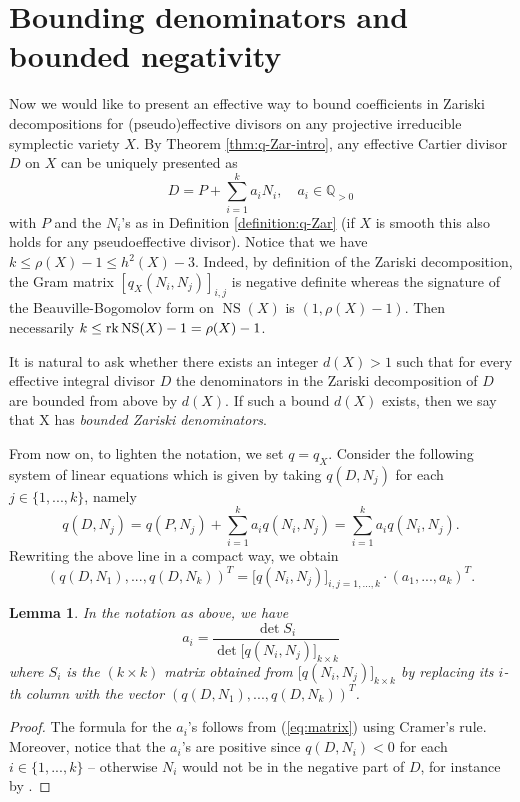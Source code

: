 \documentclass[12pt,reqno]{amsart}
\theoremstyle{plain}
\newtheorem{lemma}[thm]{Lemma}
\theoremstyle{definition}
\begin{document}
\section{Bounding denominators and bounded negativity}
Now we would like to present an effective way to bound coefficients in Zariski decompositions for (pseudo)effective divisors on any projective irreducible symplectic variety $X$.
By Theorem \ref{thm:q-Zar-intro}, any effective Cartier divisor $D$ on $X$  can be uniquely presented as
$$D = P + \sum_{i=1}^{k} a_{i}N_{i}, \quad  a_{i} \in \mathbb{Q}_{>0}$$
with $P$ and the $N_i$'s as in Definition \ref{definition:q-Zar} (if $X$ is smooth this also holds for any pseudoeffective divisor).
Notice that  we have  $k \leq \rho(X)-1 \leq h^2(X)-3$. Indeed, by definition of the Zariski decomposition,  the Gram matrix $[q_X(N_i,N_j)]_{i,j}$ is negative definite whereas the signature of the Beauville-Bogomolov form on $\operatorname{NS}(X)$ is $(1,\rho(X)-1)$. Then necessarily $k\leq \mathrm{rk} \, {\rm NS}(X)-1=\rho(X)-1$. 

It is natural to ask whether there exists an integer
$d(X) > 1$ such that for every effective integral divisor $D$ the denominators in the
Zariski decomposition of $D$ are bounded from above by $d(X)$.
If such a bound $d(X)$ exists, then we say that X has {\it bounded Zariski denominators}.

From now on, to lighten the notation, we set $q=q_X$. 
Consider the following system of linear equations which is given by taking $q(D,N_{j})$ for each $j \in \{1, ...,k\}$, namely
$$q(D,N_{j}) = q(P,N_{j}) + \sum_{i=1}^{k} a_{i} q(N_{i},N_{j}) = \sum_{i=1}^{k} a_{i} q(N_{i},N_{j}).$$
Rewriting the above line in a compact way, we obtain
\begin{equation}\label{eq:matrix}
(q(D,N_{1}), ...,q(D,N_{k}))^{T} = \bigg[ q(N_{i},N_{j}) \bigg]_{i,j=1,\ldots, k} \cdot (a_{1}, ...,a_{k})^{T}.
\end{equation}
\begin{lemma}\label{lem:a_i}
In the notation as above, we have 
$$a_{i} = \frac{\det S_i}{\det \bigg[q(N_{i},N_{j}) \bigg]_{k \times k}}$$
where $S_i$ is the $(k\times k)$ matrix  obtained from $\bigg[q(N_{i},N_{j})\bigg]_{k \times k}$ by replacing its $i$-th column with the vector $(q(D,N_{1}), ...,q(D,N_{k}))^{T}$.
\end{lemma}
\begin{proof}
 The formula for the $a_{i}$'s follows from (\ref{eq:matrix}) using Cramer's rule. 
 Moreover, notice that the $a_{i}$'s are positive since $q(D,N_{i}) < 0$ for each $i \in \{1, ...,k\}$ -- otherwise $N_{i}$ would not be in the negative part of $D$, for instance by \cite[Lemma 4.9]{Boucksom1}. 
\end{proof} 
 
\end{document}
